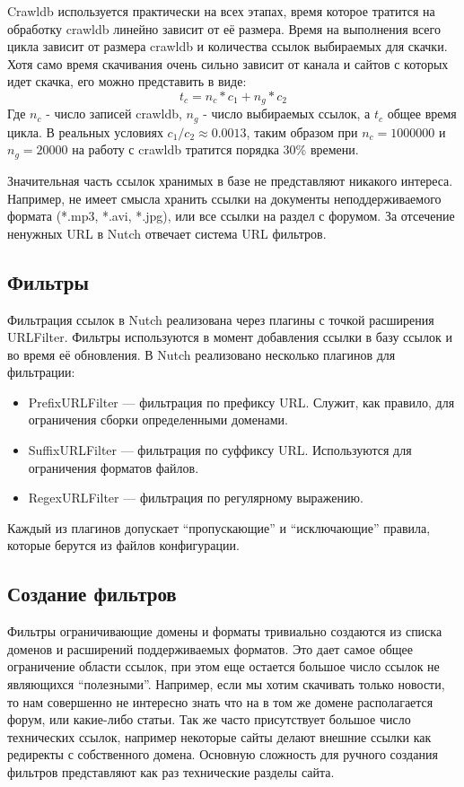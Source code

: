 Crawldb используется практически на всех этапах, время которое тратится на обработку crawldb линейно зависит от её размера. Время на выполнения всего цикла зависит от размера crawldb и количества ссылок выбираемых для скачки. Хотя само время скачивания очень сильно зависит от канала и сайтов с которых идет скачка, его можно представить в виде:
$$t_{c}=n_{c}*c_{1}+n_{g}*c_{2}$$ Где $n_{c}$ - число записей crawldb, $n_{g}$ - число выбираемых ссылок, а $t_{c}$ общее время цикла. В реальных условиях $c_{1}/c_{2}\approx 0.0013$, таким образом при $n_{c}=1000000$ и $n_{g}=20000$ на работу с crawldb тратится порядка 30\% времени. 

Значительная часть ссылок хранимых в базе не представляют никакого интереса. Например, не имеет смысла хранить ссылки на документы неподдерживаемого формата (*.mp3, *.avi, *.jpg), или все ссылки на раздел с форумом. За отсечение ненужных URL в Nutch отвечает система URL фильтров.

\subsection{Фильтры}
Фильтрация ссылок в Nutch реализована через плагины с точкой расширения URLFilter. Фильтры используются в момент добавления ссылки в базу ссылок и во время её обновления. В Nutch реализовано несколько плагинов для фильтрации:
\begin{itemize}
 \item PrefixURLFilter --- фильтрация по префиксу URL. Служит, как правило, для ограничения сборки определенными доменами.
 \item SuffixURLFilter --- фильтрация по суффиксу URL. Используются для ограничения форматов файлов.
 \item RegexURLFilter --- фильтрация по регулярному выражению. 
\end{itemize}

Каждый из плагинов допускает ``пропускающие'' и ``исключающие'' правила, которые берутся из файлов конфигурации. 

\subsection{Создание фильтров}
Фильтры ограничивающие домены и форматы тривиально создаются из списка доменов и расширений поддерживаемых форматов. Это дает самое общее ограничение области ссылок, при этом еще остается большое число ссылок не являющихся ``полезными''.
Например, если мы хотим скачивать только новости, то нам совершенно не интересно знать что на в том же домене располагается форум, или какие-либо статьи. Так же часто присутствует большое число технических ссылок, например некоторые сайты делают внешние ссылки как редиректы с собственного домена. Основную сложность для ручного создания фильтров представляют как раз технические разделы сайта.

